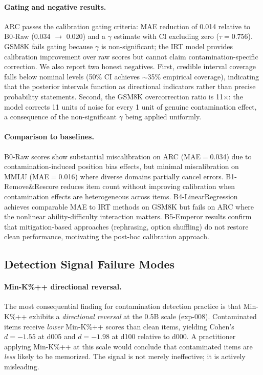 \paragraph{Gating and negative results.}
ARC passes the calibration gating criteria: MAE reduction of 0.014 relative to B0-Raw (0.034 $\to$ 0.020) and a $\gamma$ estimate with CI excluding zero ($\tau = 0.756$). GSM8K fails gating because $\gamma$ is non-significant; the IRT model provides calibration improvement over raw scores but cannot claim contamination-specific correction. We also report two honest negatives. First, credible interval coverage falls below nominal levels (50\% CI achieves $\sim$35\% empirical coverage), indicating that the posterior intervals function as directional indicators rather than precise probability statements. Second, the GSM8K overcorrection ratio is 11$\times$: the model corrects 11 units of noise for every 1 unit of genuine contamination effect, a consequence of the non-significant $\gamma$ being applied uniformly.

\paragraph{Comparison to baselines.}
B0-Raw scores show substantial miscalibration on ARC (MAE$=$0.034) due to contamination-induced position bias effects, but minimal miscalibration on MMLU (MAE$=$0.016) where diverse domains partially cancel errors. B1-Remove\&Rescore reduces item count without improving calibration when contamination effects are heterogeneous across items. B4-LinearRegression achieves comparable MAE to IRT methods on GSM8K but fails on ARC where the nonlinear ability-difficulty interaction matters. B5-Emperor \citep{sun2025emperor} results confirm that mitigation-based approaches (rephrasing, option shuffling) do not restore clean performance, motivating the post-hoc calibration approach.

\subsection{Detection Signal Failure Modes}
\label{sec:signal_failure}

\paragraph{Min-K\%++ directional reversal.}
The most consequential finding for contamination detection practice is that Min-K\%++ \citep{zhang_2024_minkpp} exhibits a \textit{directional reversal} at the 0.5B scale (exp-008). Contaminated items receive \textit{lower} Min-K\%++ scores than clean items, yielding Cohen's $d = -1.55$ at d005 and $d = -1.98$ at d100 relative to d000. A practitioner applying Min-K\%++ at this scale would conclude that contaminated items are \textit{less} likely to be memorized. The signal is not merely ineffective; it is actively misleading.

